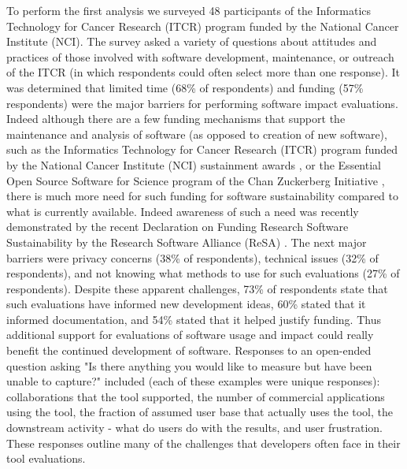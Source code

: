 \documentclass{article}
\begin{document}
To perform the first analysis we surveyed 48 participants of the Informatics Technology for Cancer Research (ITCR) program funded by the National Cancer Institute (NCI). The survey asked a variety of questions about attitudes and practices of those involved with software development, maintenance, or outreach of the ITCR (in which respondents could often select more than one response). It was determined that limited time (68\% of respondents) and funding (57\% respondents) were the major barriers for performing software impact evaluations. Indeed although there are a few funding mechanisms that support the maintenance and analysis of software (as opposed to creation of new software), such as the Informatics Technology for Cancer Research (ITCR) program funded by the National Cancer Institute (NCI) sustainment awards \cite{kibbe_cancer_2017, warner_informatics_2020}, or the Essential Open Source Software for Science program of the Chan Zuckerberg Initiative \cite{CZ_essential_2019}, there is much more need for such funding for software sustainability compared to what is currently available. Indeed awareness of such a need was recently demonstrated by the recent Declaration on Funding Research Software Sustainability by the Research Software Alliance (ReSA) \cite{barker_amsterdam_2023}. The next major barriers were privacy concerns (38\% of respondents), technical issues (32\% of respondents), and not knowing what methods to use for such evaluations (27\% of respondents). Despite these apparent challenges,  73\% of respondents state that such evaluations have informed new development ideas, 60\% stated that it informed documentation, and 54\% stated that it helped justify funding.  Thus additional support for evaluations of software usage and impact could really benefit the continued development of software. Responses to an open-ended question asking "Is there anything you would like to measure but have been unable to capture?" included (each of these examples were unique responses): collaborations that the tool supported, the number of commercial applications using the tool, the fraction of assumed user base that actually uses the tool, the downstream activity - what do users do with the results, and user frustration. These responses outline many of the challenges that developers often face in their tool evaluations.
\end{document}
